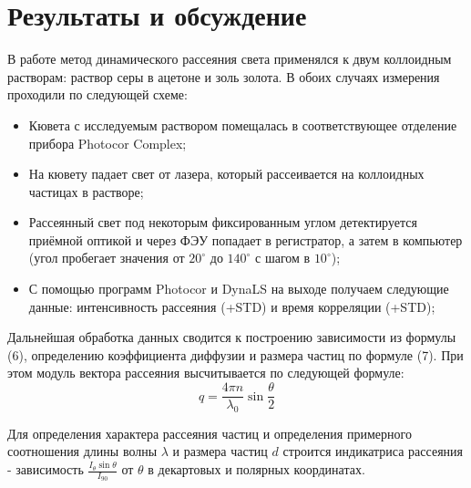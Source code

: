 \documentclass{article}
\begin{document}
\section{Результаты и обсуждение}\;
\par В работе метод динамического рассеяния света применялся к двум коллоидным растворам: раствор серы в ацетоне и золь золота. В обоих случаях измерения проходили по следующей схеме:
\begin{itemize}
    \item Кювета с исследуемым раствором помещалась в соответствующее отделение прибора Photocor Complex;
    \item На кювету падает свет от лазера, который рассеивается на коллоидных частицах в растворе;
    \item Рассеянный свет под некоторым фиксированным углом детектируется приёмной оптикой и через ФЭУ попадает в регистратор, а затем в компьютер (угол пробегает значения от $20^{\circ}$ до $140^{\circ}$ с шагом в $10^{\circ}$);
    \item С помощью программ Photocor и DynaLS на выходе получаем следующие данные: интенсивность рассеяния (+STD) и время корреляции (+STD);
\end{itemize}
\par Дальнейшая обработка данных сводится к построению зависимости из формулы (6), определению коэффициента диффузии и размера частиц по формуле (7). При этом модуль вектора рассеяния высчитывается по следующей формуле:
$$q = \frac{4\pi n}{\lambda_0}\sin{\frac{\theta}{2}}$$
\par Для определения характера рассеяния частиц и определения примерного соотношения длины волны $\lambda$ и размера частиц $d$ строится индикатриса рассеяния - зависимость $\frac{I_{\theta}\sin{\theta}}{I_{90}}$ от $\theta$ в декартовых и полярных координатах.
\end{document}
